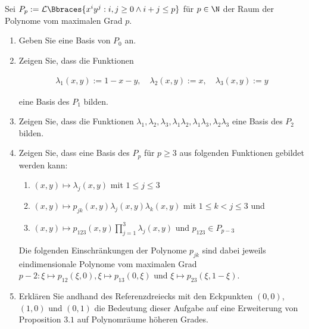 
\begin{exercise}

Sei $P_p:= \mathcal{L} \Bbraces{x^i y^j: i, j \geq 0 \land i+j \leq p}$ für $p \in \N$ der Raum der Polynome vom maximalen Grad $p$.

\begin{enumerate}[label = \textbf{\alph*)}]

  \item Geben Sie eine Basis von $P_0$ an.

  \item Zeigen Sie, dass die Funktionen

  \begin{align}
    \lambda_1(x, y) := 1-x-y, 
    \quad
    \lambda_2(x, y) := x, 
    \quad
    \lambda_3(x, y) := y
  \end{align}

  eine Basis des $P_1$ bilden.

  \item Zeigen Sie, dass die Funktionen $\lambda_1, \lambda_2, \lambda_3, \lambda_1 \lambda_2, \lambda_1 \lambda_3, \lambda_2\lambda_3$ eine Basis des $P_2$ bilden.

  \item Zeigen Sie, dass eine Basis des $P_p$ für $p \geq 3$ aus folgenden Funktionen gebildet werden kann:

  \begin{enumerate}[label = (\roman*)]
    \item $(x, y) \mapsto \lambda_j(x, y)$ mit $1 \leq j \leq 3$
    \item $(x, y) \mapsto p_{jk}(x, y)\lambda_j(x, y)\lambda_k(x, y)$ mit $1 \leq k < j \leq 3$ und
    \item $(x, y) \mapsto p_{123}(x, y) \prod_{j=1}^3 \lambda_j(x, y)$ und $p_{123} \in P_{p-3}$
  \end{enumerate}

  Die folgenden Einschränkungen der Polynome $p_{jk}$ sind dabei jeweils eindimensionale Polynome vom maximalen Grad $p-2: \xi \mapsto p_{12}(\xi, 0), \xi \mapsto p_{13}(0, \xi)$ und $\xi \mapsto p_{23}(\xi, 1-\xi)$.

  \item Erklären Sie andhand des Referenzdreiecks mit den Eckpunkten $(0, 0)$, $(1, 0)$ und $(0, 1)$ die Bedeutung dieser Aufgabe auf eine Erweiterung von Proposition $3.1$ auf Polynomräume höheren Grades.

\end{enumerate}

\end{exercise}

